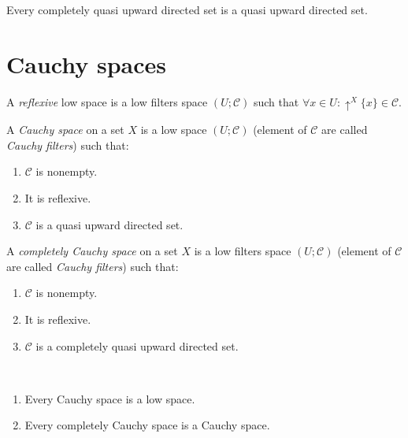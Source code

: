 \begin{obvious}
Every completely quasi upward directed set is a quasi upward directed set.
\end{obvious}

\section{Cauchy spaces}

\begin{defn}
A \emph{reflexive} low space is a low filters space $( U ; \mathscr{C})$ such that
$\forall x \in U : \uparrow^X \{ x \} \in \mathscr{C}$.
\end{defn}

\begin{defn}
  A \emph{Cauchy space} on a set $X$ is a low space $\left( U ;
  \mathscr{C} \right)$ (element of $\mathscr{C}$ are called \emph{Cauchy
  filters}) such that:
  \begin{enumerate}
    \item $\mathscr{C}$ is nonempty.
    \item It is reflexive.
    \item $\mathscr{C}$ is a quasi upward directed set.
  \end{enumerate}
\end{defn}

\begin{defn}
  A \emph{completely Cauchy space} on a set $X$ is a low filters space
  $\left( U ; \mathscr{C} \right)$ (element of $\mathscr{C}$ are called
  \emph{Cauchy filters}) such that:
  \begin{enumerate}
    \item $\mathscr{C}$ is nonempty.
    \item It is reflexive.
    \item $\mathscr{C}$ is a completely quasi upward directed set.
  \end{enumerate}
\end{defn}

\begin{obvious}
~
\begin{enumerate}
\item Every Cauchy space is a low space.
\item Every completely Cauchy space is a Cauchy space.
\end{enumerate}
\end{obvious}


